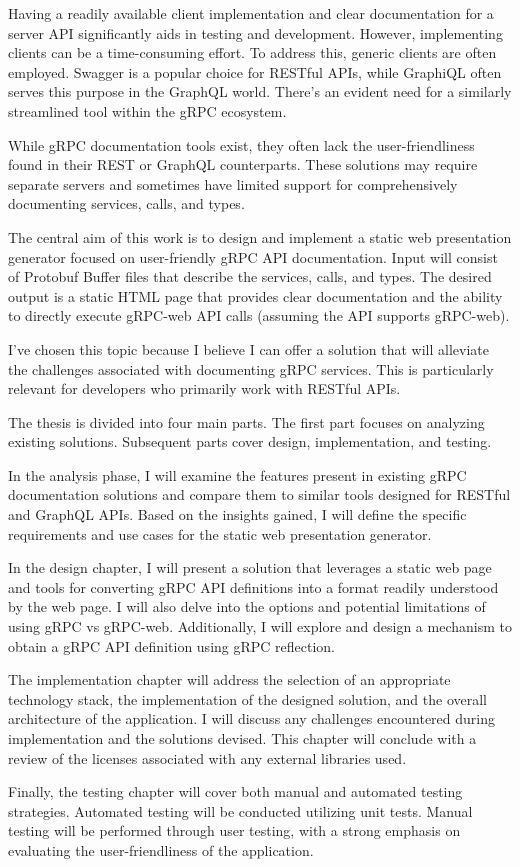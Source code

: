 Having a readily available client implementation and clear documentation for a server API significantly aids in testing and development.
However, implementing clients can be a time-consuming effort.
To address this, generic clients are often employed.
Swagger is a popular choice for RESTful APIs, while GraphiQL often serves this purpose in the GraphQL world.
There's an evident need for a similarly streamlined tool within the gRPC ecosystem.

While gRPC documentation tools exist, they often lack the user-friendliness found in their REST or GraphQL counterparts.
These solutions may require separate servers and sometimes have limited support for comprehensively documenting services, calls, and types.

The central aim of this work is to design and implement a static web presentation generator focused on user-friendly gRPC API documentation.
Input will consist of Protobuf Buffer files that describe the services, calls, and types.
The desired output is a static HTML page that provides clear documentation and the ability to directly execute gRPC-web API calls (assuming the API supports gRPC-web).

I've chosen this topic because I believe I can offer a solution that will alleviate the challenges associated with documenting gRPC services.
This is particularly relevant for developers who primarily work with RESTful APIs.

The thesis is divided into four main parts.
The first part focuses on analyzing existing solutions.
Subsequent parts cover design, implementation, and testing.

In the analysis phase, I will examine the features present in existing gRPC documentation solutions and compare them to similar tools designed for RESTful and GraphQL APIs.
Based on the insights gained, I will define the specific requirements and use cases for the static web presentation generator.

In the design chapter, I will present a solution that leverages a static web page and tools for converting gRPC API definitions into a format readily understood by the web page.
I will also delve into the options and potential limitations of using gRPC vs gRPC-web.
Additionally, I will explore and design a mechanism to obtain a gRPC API definition using gRPC reflection.

The implementation chapter will address the selection of an appropriate technology stack, the implementation of the designed solution, and the overall architecture of the application.
I will discuss any challenges encountered during implementation and the solutions devised.
This chapter will conclude with a review of the licenses associated with any external libraries used.

Finally, the testing chapter will cover both manual and automated testing strategies.
Automated testing will be conducted utilizing unit tests.
Manual testing will be performed through user testing, with a strong emphasis on evaluating the user-friendliness of the application.